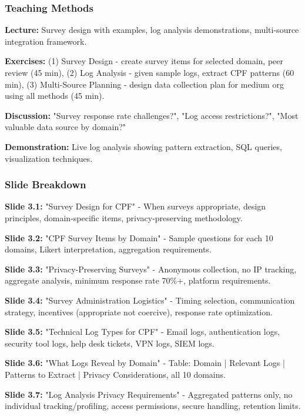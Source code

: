 \documentclass[11pt,a4paper]{article}
\begin{document}
\subsubsection{Teaching Methods}

\textbf{Lecture:} Survey design with examples, log analysis demonstrations, multi-source integration framework.

\textbf{Exercises:} (1) Survey Design - create survey items for selected domain, peer review (45 min), (2) Log Analysis - given sample logs, extract CPF patterns (60 min), (3) Multi-Source Planning - design data collection plan for medium org using all methods (45 min).

\textbf{Discussion:} "Survey response rate challenges?", "Log access restrictions?", "Most valuable data source by domain?"

\textbf{Demonstration:} Live log analysis showing pattern extraction, SQL queries, visualization techniques.

\subsubsection{Slide Breakdown}

\textbf{Slide 3.1:} "Survey Design for CPF" - When surveys appropriate, design principles, domain-specific items, privacy-preserving methodology.

\textbf{Slide 3.2:} "CPF Survey Items by Domain" - Sample questions for each 10 domains, Likert interpretation, aggregation requirements.

\textbf{Slide 3.3:} "Privacy-Preserving Surveys" - Anonymous collection, no IP tracking, aggregate analysis, minimum response rate 70\%+, platform requirements.

\textbf{Slide 3.4:} "Survey Administration Logistics" - Timing selection, communication strategy, incentives (appropriate not coercive), response rate optimization.

\textbf{Slide 3.5:} "Technical Log Types for CPF" - Email logs, authentication logs, security tool logs, help desk tickets, VPN logs, SIEM logs.

\textbf{Slide 3.6:} "What Logs Reveal by Domain" - Table: Domain | Relevant Logs | Patterns to Extract | Privacy Considerations, all 10 domains.

\textbf{Slide 3.7:} "Log Analysis Privacy Requirements" - Aggregated patterns only, no individual tracking/profiling, access permissions, secure handling, retention limits.
\end{document}
